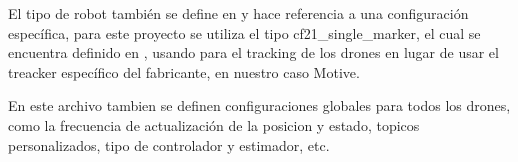 \documentclass[a4paper,11pt,spanish]{sphinxmanual}
\begin{document}
\sphinxAtStartPar
El tipo de robot también se define en  y hace referencia a una configuración específica, para este proyecto se utiliza el tipo cf21\_single\_marker, el cual se encuentra definido en , usando  para el tracking de los drones en lugar de usar el treacker específico del fabricante, en nuestro caso Motive.

\begin{sphinxVerbatim}[commandchars=\\\{\}]
\end{sphinxVerbatim}

\sphinxAtStartPar
En este archivo tambien se definen configuraciones globales para todos los drones, como la frecuencia de actualización de la posicion y estado, topicos personalizados, tipo de controlador y estimador, etc.
\end{document}
